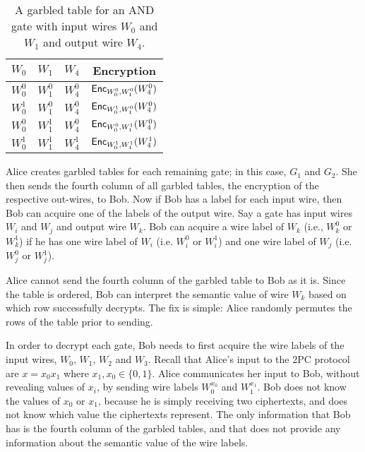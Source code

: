 \begin{table}[h]
\centering
\begin{tabular}{|c|c|c|c|}
\hline
$W_0$ & $W_1$ & $W_4$ & Encryption \\
\hline
$W_0^0$ & $W_1^0$ & $W_4^0$ & $\textsf{Enc}_{W_0^0, W_1^0}(W_4^0)$ \\
$W_0^1$ & $W_1^0$ & $W_4^0$ & $\textsf{Enc}_{W_0^1, W_1^0}(W_4^0)$ \\
$W_0^0$ & $W_1^1$ & $W_4^0$ & $\textsf{Enc}_{W_0^0, W_1^1}(W_4^0)$ \\
$W_0^1$ & $W_1^1$ & $W_4^1$ & $\textsf{Enc}_{W_0^1, W_1^1}(W_4^1)$ \\
\hline
\end{tabular}
\caption[Garbled table of an AND gate]{A garbled table for an AND gate with input wires $W_0$ and $W_1$ and output wire $W_4$.}
\label{tbl:g0-table}
\end{table}

Alice creates garbled tables for each remaining gate; in this case, $G_1$ and $G_2$.
She then sends the fourth column of all garbled tables, the encryption of the respective out-wires, to Bob.
Now if Bob has a label for each input wire, then Bob can acquire one of the labels of the output wire.
Say a gate has input wires $W_i$ and $W_j$ and output wire $W_k$.
Bob can acquire a wire label of $W_k$ (i.e., $W_k^0$ or $W_k^1$) if he has one wire label of $W_i$ (i.e. $W_i^0$ or $W_i^1$) and one wire label of $W_j$ (i.e. $W_j^0$ or $W_j^1$).

Alice cannot send the fourth column of the garbled table to Bob as it is. 
Since the table is ordered, Bob can interpret the semantic value of wire $W_k$ based on which row successfully decrypts. 
The fix is simple: Alice randomly permutes the rows of the table prior to sending.

In order to decrypt each gate, Bob needs to first acquire the wire labels of the input wires, $W_0$, $W_1$, $W_2$ and $W_3$.
Recall that Alice's input to the 2PC protocol are $x = x_0x_1$ where $x_1, x_0 \in \{0,1\}$.
Alice communicates her input to Bob, without revealing values of $x_i$, by sending wire labels $W_0^{x_0}$ and $W_1^{x_1}$.
Bob does not know the values of $x_0$ or $x_1$, because he is simply receiving two ciphertexts, and does not know which value the ciphertexts represent.
The only information that Bob has is the fourth column of the garbled tables, and that does not provide any information about the semantic value of the wire labels.

